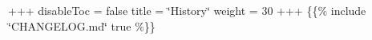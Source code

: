 +++ disable\+Toc = false title = \char`\"{}\+History\char`\"{} weight = 30 +++ \{\{\% include \char`\"{}\+CHANGELOG.\+md\char`\"{} true \%\}\} 